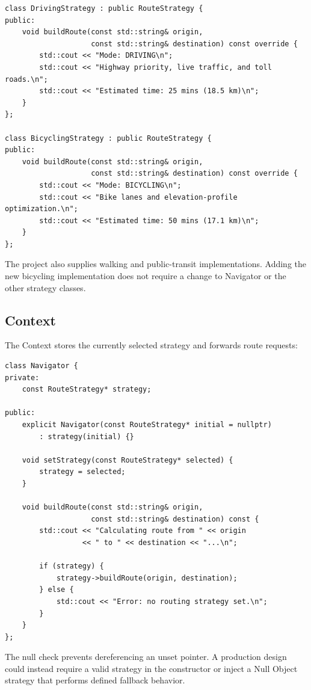 \documentclass[11pt,a4paper]{report}
\begin{document}
\begin{lstlisting}[style=cpp]
class DrivingStrategy : public RouteStrategy {
public:
    void buildRoute(const std::string& origin,
                    const std::string& destination) const override {
        std::cout << "Mode: DRIVING\n";
        std::cout << "Highway priority, live traffic, and toll roads.\n";
        std::cout << "Estimated time: 25 mins (18.5 km)\n";
    }
};

class BicyclingStrategy : public RouteStrategy {
public:
    void buildRoute(const std::string& origin,
                    const std::string& destination) const override {
        std::cout << "Mode: BICYCLING\n";
        std::cout << "Bike lanes and elevation-profile optimization.\n";
        std::cout << "Estimated time: 50 mins (17.1 km)\n";
    }
};
\end{lstlisting}

The project also supplies walking and public-transit implementations. Adding the
new bicycling implementation does not require a change to Navigator or the
other strategy classes.

\subsection{Context}
The Context stores the currently selected strategy and forwards route requests:

\begin{lstlisting}[style=cpp]
class Navigator {
private:
    const RouteStrategy* strategy;

public:
    explicit Navigator(const RouteStrategy* initial = nullptr)
        : strategy(initial) {}

    void setStrategy(const RouteStrategy* selected) {
        strategy = selected;
    }

    void buildRoute(const std::string& origin,
                    const std::string& destination) const {
        std::cout << "Calculating route from " << origin
                  << " to " << destination << "...\n";

        if (strategy) {
            strategy->buildRoute(origin, destination);
        } else {
            std::cout << "Error: no routing strategy set.\n";
        }
    }
};
\end{lstlisting}

The null check prevents dereferencing an unset pointer. A production design
could instead require a valid strategy in the constructor or inject a Null
Object strategy that performs defined fallback behavior.
\end{document}
